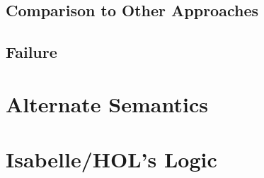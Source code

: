 \documentclass[11pt]{article}
\numberwithin{equation}{subsection}
\begin{document}
\subsection{Comparison to Other Approaches}
\subsection{Failure}


% 

\appendix
\section{Alternate Semantics}
\label{alternative}


\section{Isabelle/HOL's Logic}

\pagebreak
{}


\end{document}
